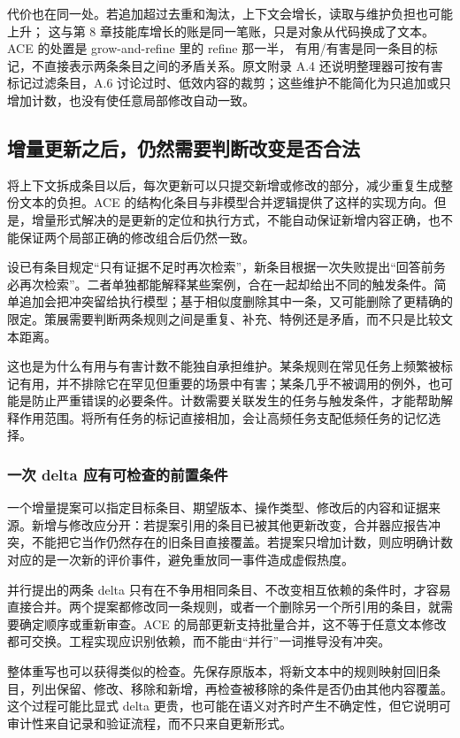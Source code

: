 代价也在同一处。若追加超过去重和淘汰，上下文会增长，读取与维护负担也可能上升；
这与第 8 章技能库增长的账是同一笔账，只是对象从代码换成了文本。
ACE 的处置是 grow-and-refine 里的 refine 那一半，
有用/有害是同一条目的标记，不直接表示两条条目之间的矛盾关系。原文附录 A.4 还说明整理器可按有害标记过滤条目，A.6 讨论过时、低效内容的裁剪；这些维护不能简化为只追加或只增加计数，也没有使任意局部修改自动一致\cite{ace-2510}。

\subsection{增量更新之后，仍然需要判断改变是否合法}
\label{sec:ch07-update-contract}

将上下文拆成条目以后，每次更新可以只提交新增或修改的部分，减少重复生成整份文本的负担。ACE 的结构化条目与非模型合并逻辑提供了这样的实现方向\cite{ace-2510}。但是，增量形式解决的是更新的定位和执行方式，不能自动保证新增内容正确，也不能保证两个局部正确的修改组合后仍然一致。

设已有条目规定“只有证据不足时再次检索”，新条目根据一次失败提出“回答前务必再次检索”。二者单独都能解释某些案例，合在一起却给出不同的触发条件。简单追加会把冲突留给执行模型；基于相似度删除其中一条，又可能删除了更精确的限定。策展需要判断两条规则之间是重复、补充、特例还是矛盾，而不只是比较文本距离。

这也是为什么有用与有害计数不能独自承担维护。某条规则在常见任务上频繁被标记有用，并不排除它在罕见但重要的场景中有害；某条几乎不被调用的例外，也可能是防止严重错误的必要条件。计数需要关联发生的任务与触发条件，才能帮助解释作用范围。将所有任务的标记直接相加，会让高频任务支配低频任务的记忆选择。

\subsubsection{一次 delta 应有可检查的前置条件}

一个增量提案可以指定目标条目、期望版本、操作类型、修改后的内容和证据来源。新增与修改应分开：若提案引用的条目已被其他更新改变，合并器应报告冲突，不能把它当作仍然存在的旧条目直接覆盖。若提案只增加计数，则应明确计数对应的是一次新的评价事件，避免重放同一事件造成虚假热度。

并行提出的两条 delta 只有在不争用相同条目、不改变相互依赖的条件时，才容易直接合并。两个提案都修改同一条规则，或者一个删除另一个所引用的条目，就需要确定顺序或重新审查。ACE 的局部更新支持批量合并，这不等于任意文本修改都可交换。工程实现应识别依赖，而不能由“并行”一词推导没有冲突。

整体重写也可以获得类似的检查。先保存原版本，将新文本中的规则映射回旧条目，列出保留、修改、移除和新增，再检查被移除的条件是否仍由其他内容覆盖。这个过程可能比显式 delta 更贵，也可能在语义对齐时产生不确定性，但它说明可审计性来自记录和验证流程，而不只来自更新形式。

